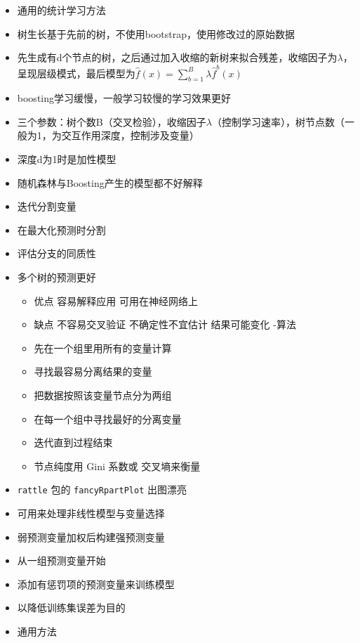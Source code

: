 \documentclass[]{book}
\providecommand{\tightlist}{%
  \setlength{\itemsep}{0pt}\setlength{\parskip}{0pt}}
\begin{document}
\begin{itemize}
\item
  通用的统计学习方法
\item
  树生长基于先前的树，不使用bootstrap，使用修改过的原始数据
\item
  先生成有d个节点的树，之后通过加入收缩的新树来拟合残差，收缩因子为\(\lambda\)，呈现层级模式，最后模型为\(\hat f(x) = \sum_{b = 1}^B \lambda \hat f^b(x)\)
\item
  boosting学习缓慢，一般学习较慢的学习效果更好
\item
  三个参数：树个数B（交叉检验），收缩因子\(\lambda\)（控制学习速率），树节点数（一般为1，为交互作用深度，控制涉及变量）
\item
  深度d为1时是加性模型
\item
  随机森林与Boosting产生的模型都不好解释
\item
  迭代分割变量
\item
  在最大化预测时分割
\item
  评估分支的同质性
\item
  多个树的预测更好

  \begin{itemize}
  \tightlist
  \item
    优点 容易解释应用 可用在神经网络上
  \item
    缺点 不容易交叉验证 不确定性不宜估计 结果可能变化
    -算法
  \item
    先在一个组里用所有的变量计算
  \item
    寻找最容易分离结果的变量
  \item
    把数据按照该变量节点分为两组
  \item
    在每一个组中寻找最好的分离变量
  \item
    迭代直到过程结束\\
  \item
    节点纯度用 Gini 系数或 交叉墒来衡量
  \end{itemize}
\item
  \texttt{rattle} 包的 \texttt{fancyRpartPlot} 出图漂亮
\item
  可用来处理非线性模型与变量选择
\item
  弱预测变量加权后构建强预测变量
\item
  从一组预测变量开始
\item
  添加有惩罚项的预测变量来训练模型
\item
  以降低训练集误差为目的
\item
  通用方法
\end{itemize}
\end{document}
